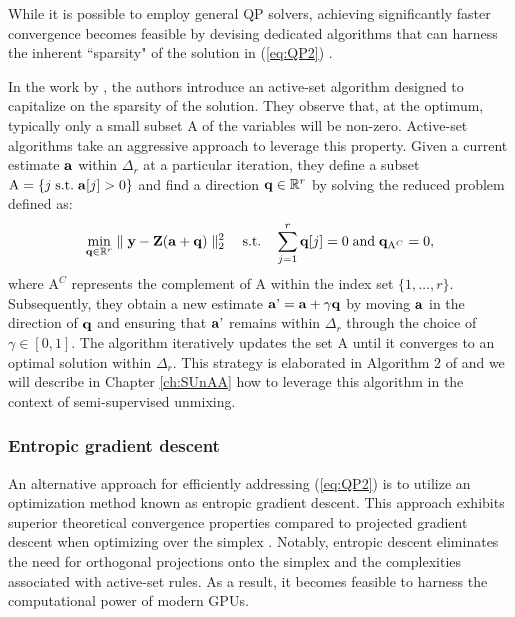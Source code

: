 While it is possible to employ general QP solvers, achieving significantly faster convergence becomes feasible by devising dedicated algorithms that can harness the inherent ``sparsity" of the solution in (\ref{eq:QP2}) \cite{bach_optimization_2012}.

In the work by \cite{chen_fast_2014}, the authors introduce an active-set algorithm \cite{nocedal_numerical_1999} designed to capitalize on the sparsity of the solution.
They observe that, at the optimum, typically only a small subset $\mathrm{A}$ of the variables will be non-zero.
Active-set algorithms take an aggressive approach to leverage this property.
Given a current estimate $\mathbf a$ within $\Delta_r$ at a particular iteration, they define a subset $\mathrm{A} = \left\{j \; \text{s.t.} \; \mathbf a[j] > 0 \right\}$ and find a direction $\mathbf q \in \mathbb R^r$ by solving the reduced problem defined as:
\begin{equation}
    \label{eq:reduced}
    \min_{\mathbf q \in \mathbb R^r} \parallel \mathbf y - \mathbf Z(\mathbf a + \mathbf q) \parallel_2^2 \quad \text{s.t.} \quad \sum_{j=1}^r \mathbf q[j] = 0 \; \text{and} \; \mathbf q_{\mathrm{A}^C} = 0,
\end{equation}
where $\mathrm{A}^C$ represents the complement of $\mathrm{A}$ within the index set $\{1, \ldots, r\}$. Subsequently, they obtain a new estimate $\mathbf a\text{'} = \mathbf a + \gamma \mathbf q$ by moving $\mathbf a$ in the direction of $\mathbf q$ and ensuring that $\mathbf a\text{'}$ remains within $\Delta_r$ through the choice of $\gamma \in [0,1]$.
The algorithm iteratively updates the set $\mathrm{A}$ until it converges to an optimal solution within $\Delta_r$.
This strategy is elaborated in Algorithm 2 of \cite{chen_fast_2014} and we will describe in Chapter \ref{ch:SUnAA} how to leverage this algorithm in the context of semi-supervised unmixing.

\subsubsection{Entropic gradient descent}
\label{subsubsec:EDA_intro}

An alternative approach for efficiently addressing (\ref{eq:QP2}) is to utilize an optimization method known as entropic gradient descent.
This approach exhibits superior theoretical convergence properties compared to projected gradient descent when optimizing over the simplex \cite{beck_mirror_2003}.
Notably, entropic descent eliminates the need for orthogonal projections onto the simplex and the complexities associated with active-set rules.
As a result, it becomes feasible to harness the computational power of modern GPUs.

